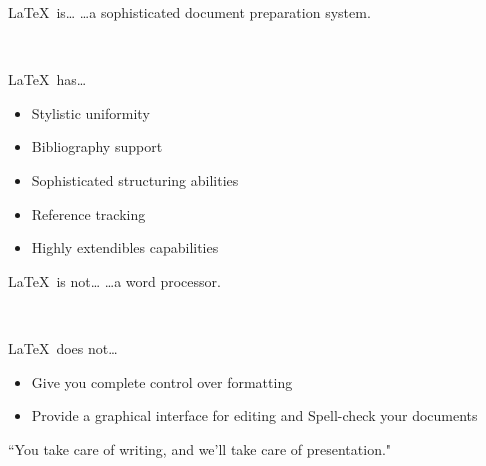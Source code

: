 
\begin{frame}{\LaTeX~is\ldots}
\ldots a sophisticated document preparation system.

~\\

\begin{block}{\LaTeX~has\ldots}
\begin{itemize}
\item Stylistic uniformity
\item Bibliography support
\item Sophisticated structuring abilities
\item Reference tracking
\item Highly extendibles capabilities
\end{itemize}
\end{block}
\end{frame}


\begin{frame}{\LaTeX~is not\ldots}
\ldots a word processor.

~\\

\begin{block}{\LaTeX~does not\ldots}
\begin{itemize}
\item Give you complete control over formatting
\item Provide a graphical interface for editing and Spell-check your documents\footnotemark
\end{itemize}
\end{block}
``You take care of writing, and we'll take care of presentation."
\end{frame}

